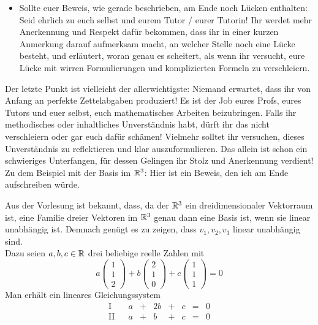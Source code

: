 \begin{phasethree}[Aufschreiben]
\begin{itemize}
        \item Sollte euer Beweis, wie gerade beschrieben, am Ende noch Lücken enthalten: Seid ehrlich zu euch selbst und eurem Tutor / eurer Tutorin! Ihr werdet mehr Anerkennung und Respekt dafür bekommen, dass ihr in einer kurzen Anmerkung darauf aufmerksam macht, an welcher Stelle noch eine Lücke besteht, und erläutert, woran genau es scheitert, als wenn ihr versucht, eure Lücke mit wirren Formulierungen und komplizierten Formeln zu verschleiern.
    \end{itemize}
    Der letzte Punkt ist vielleicht der allerwichtigste: Niemand erwartet, dass ihr von Anfang an perfekte Zettelabgaben produziert! Es ist der Job eures Profs,  eures Tutors und euer selbst, euch mathematisches Arbeiten beizubringen. Falls ihr methodisches oder inhaltliches Unverständnis habt, dürft ihr das nicht verschleiern oder gar euch dafür schämen! Vielmehr solltet ihr versuchen, dieses Unverständnis zu reflektieren und klar auszuformulieren. Das allein ist schon ein schwieriges Unterfangen, für dessen Gelingen ihr Stolz und Anerkennung verdient! \\[0.5em]
    Zu dem Beispiel mit der Basis im $\mathbb R^3$: Hier ist ein Beweis, den ich am Ende aufschreiben würde.
    \begin{bew}
        Aus der Vorlesung ist bekannt, dass, da der $\mathbb R^3$ ein dreidimensionaler Vektorraum ist, eine Familie dreier Vektoren im $\mathbb R^3$ genau dann eine Basis ist, wenn sie linear unabhängig ist. Demnach genügt es zu zeigen, dass $v_1,v_2,v_3$ linear unabhängig sind. \\[0.5em]
        Dazu seien $a,b,c\in \mathbb R$ drei beliebige reelle Zahlen mit
            \[ a\begin{pmatrix} 1 \\ 1 \\ 2 \end{pmatrix} + b \begin{pmatrix} 2 \\ 1 \\ 0 \end{pmatrix}+c \begin{pmatrix} 1 \\ 1 \\ 1 \end{pmatrix} = 0  \]
        Man erhält ein lineares Gleichungssystem
        \[\begin{array}{rcccccccc}
            \text{I} &&    a &+& 2b &+& c &=& 0 \\
            \text{II}&& a &+& b &+& c & =& 0 \\

\end{array}\]
\end{bew}
\end{phasethree}
